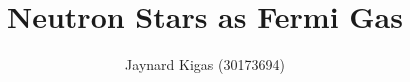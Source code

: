 \documentclass[aip,preprint]{revtex4-1}
\begin{document}
\title{Neutron Stars as Fermi Gas}

\author{Jaynard Kigas (30173694)}

\maketitle 









\end{document}
